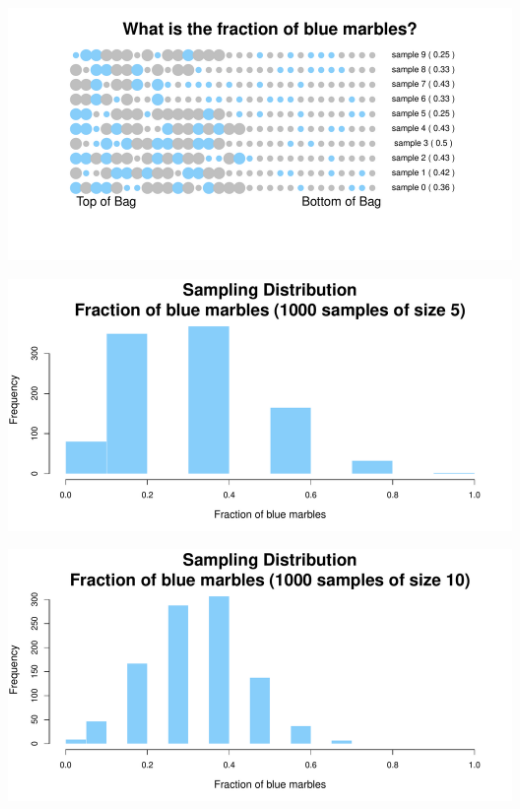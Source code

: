 \documentclass[aspectratio=169]{beamer}
\theoremstyle{principle}
\begin{document}
\begin{frame}
\begin{center}
\includegraphics[scale=0.57]{sample_full.pdf}
\end{center}
\end{frame}

\begin{frame}
\begin{center}
\includegraphics[scale=0.57]{hist_1000_samples_5_size.pdf}
\end{center}
\end{frame}

\begin{frame}
\begin{center}
\includegraphics[scale=0.57]{hist_1000_samples_10_size.pdf}
\end{center}
\end{frame}
\end{document}
